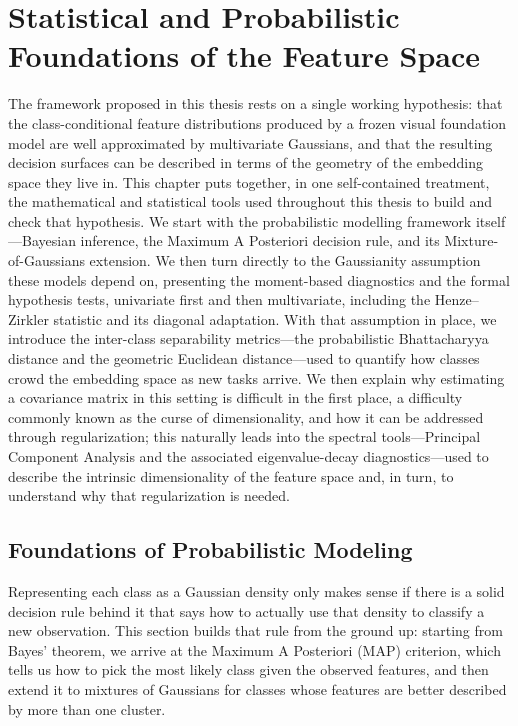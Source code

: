 \chapter{Statistical and Probabilistic Foundations of the Feature Space}
\label{ch:gaussian_space}

The framework proposed in this thesis rests on a single working hypothesis: that the class-conditional feature distributions produced by a frozen visual foundation model are well approximated by multivariate Gaussians, and that the resulting decision surfaces can be described in terms of the geometry of the embedding space they live in. This chapter puts together, in one self-contained treatment, the mathematical and statistical tools used throughout this thesis to build and check that hypothesis. We start with the probabilistic modelling framework itself---Bayesian inference, the Maximum A Posteriori decision rule, and its Mixture-of-Gaussians extension. We then turn directly to the Gaussianity assumption these models depend on, presenting the moment-based diagnostics and the formal hypothesis tests, univariate first and then multivariate, including the Henze--Zirkler statistic and its diagonal adaptation. With that assumption in place, we introduce the inter-class separability metrics---the probabilistic Bhattacharyya distance and the geometric Euclidean distance---used to quantify how classes crowd the embedding space as new tasks arrive. We then explain why estimating a covariance matrix in this setting is difficult in the first place, a difficulty commonly known as the curse of dimensionality, and how it can be addressed through regularization; this naturally leads into the spectral tools---Principal Component Analysis and the associated eigenvalue-decay diagnostics---used to describe the intrinsic dimensionality of the feature space and, in turn, to understand why that regularization is needed.

\section{Foundations of Probabilistic Modeling}
\label{sec:framework:probabilistic}

Representing each class as a Gaussian density only makes sense if there is a solid decision rule behind it that says how to actually use that density to classify a new observation. This section builds that rule from the ground up: starting from Bayes' theorem, we arrive at the Maximum A Posteriori (MAP) criterion, which tells us how to pick the most likely class given the observed features, and then extend it to mixtures of Gaussians for classes whose features are better described by more than one cluster. 
